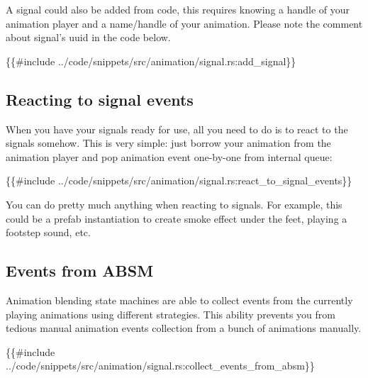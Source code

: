 \documentclass[
]{book}
\newenvironment{Shaded}{\begin{snugshade}}{\end{snugshade}}
\newcommand{\NormalTok}[1]{#1}
\theoremstyle{definition}
\theoremstyle{definition}
\theoremstyle{definition}
\theoremstyle{definition}
\theoremstyle{remark}
\begin{document}
A signal could also be added from code, this requires knowing a handle of your animation player and a name/handle of your animation. Please note the comment about signal's uuid in the code below.

\begin{Shaded}
\begin{Highlighting}[]
\NormalTok{\{\{\#include ../code/snippets/src/animation/signal.rs:add\_signal\}\}}
\end{Highlighting}
\end{Shaded}

\subsection{Reacting to signal events}\label{reacting-to-signal-events}

When you have your signals ready for use, all you need to do is to react to the signals somehow. This is very simple: just borrow your animation from the animation player and pop animation event one-by-one from internal queue:

\begin{Shaded}
\begin{Highlighting}[]
\NormalTok{\{\{\#include ../code/snippets/src/animation/signal.rs:react\_to\_signal\_events\}\}}
\end{Highlighting}
\end{Shaded}

You can do pretty much anything when reacting to signals. For example, this could be a prefab instantiation to create smoke effect under the feet, playing a footstep sound, etc.

\subsection{Events from ABSM}\label{events-from-absm}

Animation blending state machines are able to collect events from the currently playing animations using different strategies. This ability prevents you from tedious manual animation events collection from a bunch of animations manually.

\begin{Shaded}
\begin{Highlighting}[]
\NormalTok{\{\{\#include ../code/snippets/src/animation/signal.rs:collect\_events\_from\_absm\}\}}
\end{Highlighting}
\end{Shaded}
\end{document}

